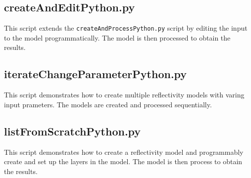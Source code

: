 \documentclass{article}
\begin{document}


\subsection{createAndEditPython.py} 

This script extends the
\texttt{createAndProcessPython.py} script by editing the input to the model
programmatically. The model is then processed to obtain the results.



\subsection{iterateChangeParameterPython.py} 
This script demonstrates how to create
multiple reflectivity models with varing input prameters. The models are created
and processed sequentially.



\subsection{listFromScratchPython.py} 
This script demonstrates how to create a
reflectivity model and programmably create and set up the layers in the model.
The model is then process to obtain the results.


\end{document}
